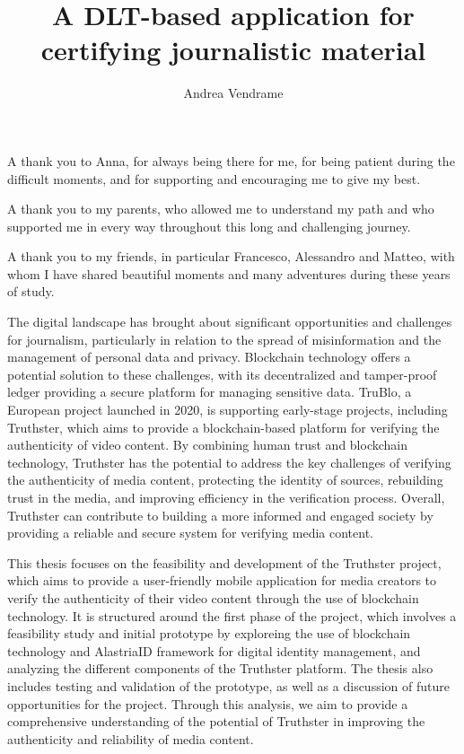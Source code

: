 \documentclass[target=mst,aauheader=]{thud}
\title{A DLT-based application for certifying journalistic material}
\author{Andrea Vendrame}
\begin{document}
\maketitle

\acknowledgements
A thank you to Anna, for always being there for me, for being patient during the difficult moments, and for supporting and encouraging me to give my best.


A thank you to my parents, who allowed me to understand my path and who supported me in every way throughout this long and challenging journey.


A thank you to my friends, in particular Francesco, Alessandro and Matteo, with whom I have shared beautiful moments and many adventures during these years of study.

\abstract
The digital landscape has brought about significant opportunities and challenges for journalism, particularly in relation to the spread of misinformation and the management of personal data and privacy. Blockchain technology offers a potential solution to these challenges, with its decentralized and tamper-proof ledger providing a secure platform for managing sensitive data. TruBlo, a European project launched in 2020, is supporting early-stage projects, including Truthster, which aims to provide a blockchain-based platform for verifying the authenticity of video content. By combining human trust and blockchain technology, Truthster has the potential to address the key challenges of verifying the authenticity of media content, protecting the identity of sources, rebuilding trust in the media, and improving efficiency in the verification process. Overall, Truthster can contribute to building a more informed and engaged society by providing a reliable and secure system for verifying media content.

This thesis focuses on the feasibility and development of the Truthster project, which aims to provide a user-friendly mobile application for media creators to verify the authenticity of their video content through the use of blockchain technology. It is structured around the first phase of the project, which involves a feasibility study and initial prototype by exploreing the use of blockchain technology and AlastriaID framework for digital identity management, and analyzing the different components of the Truthster platform. The thesis also includes testing and validation of the prototype, as well as a discussion of future opportunities for the project. Through this analysis, we aim to provide a comprehensive understanding of the potential of Truthster in improving the authenticity and reliability of media content.
\end{document}
